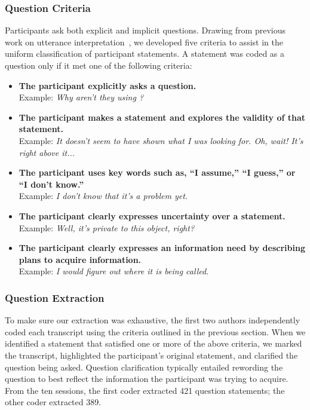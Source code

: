 \documentclass{sig-alternate}
\newcommand{\compresslist}{
	\vspace{-1em}
	\setlength{\itemsep}{1pt}
	\setlength{\parskip}{0pt}
	\setlength{\parsep}{0pt}
}
\begin{document}
\subsubsection{Question Criteria}

Participants ask both explicit and implicit questions. 
Drawing from previous work on utterance interpretation~\cite{letovsky1987cognitive}, we developed five criteria to assist in the uniform classification of participant statements. 
A statement was coded as a question only if it met one of the following criteria:
\\
\begin{itemize}
\compresslist	
\item \textbf{The participant explicitly asks a question.}
\\ Example: \textit{Why aren't they using ?}
\item \textbf{The participant makes a statement and explores the validity of that statement.}
\\ Example: \textit{It doesn't seem to have shown what I was looking for. Oh, wait! It's right above it...}
\item \textbf{The participant uses key words such as, ``I assume,'' ``I guess,'' or ``I don't know.''}
\\ Example: \textit{I don't know that it's a problem yet.}
\item \textbf{The participant clearly expresses uncertainty over a statement.}
\\ Example: \textit{Well, it's private to this object, right?}
\item \textbf{The participant clearly expresses an information need by describing plans to acquire information.}
\\ Example: \textit{I would figure out where it is being called.}

\end{itemize}




\subsubsection{Question Extraction}
To make sure our extraction was exhaustive, the first two authors independently coded each transcript using the criteria outlined in the previous section.
When we identified a statement that satisfied one or more of the above criteria, we marked the transcript, highlighted the participant's original statement, and clarified the question being asked.
Question clarification typically entailed rewording the question to best reflect the information the participant was trying to acquire.
From the ten sessions, the first coder extracted 421 question statements; the other coder extracted 389. 
\end{document}
